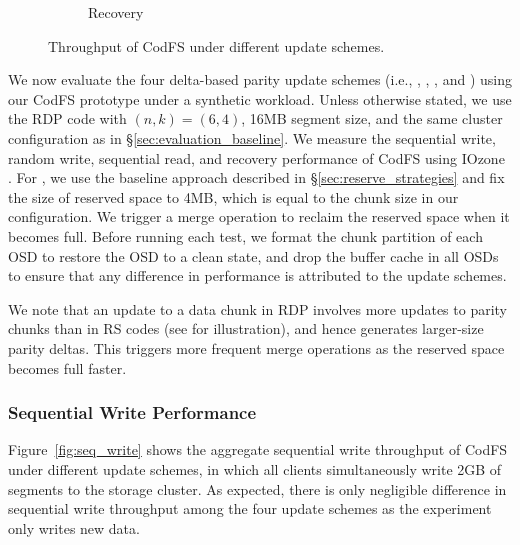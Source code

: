 \begin{figure}[t]
\begin{subfigure}[t]{0.48\linewidth}
     \caption{Recovery}
	 \label{fig:recovery}
 \end{subfigure}
 \setlength{}
 \setlength{}
 \caption{Throughput of CodFS under different update schemes.}
 \setlength\abovecaptionskip{10pt}
 \setlength\belowcaptionskip{0pt}
 \label{fig:update_schemes}
\end{figure}

We now evaluate the four delta-based parity update schemes (i.e., \FO, \FL, 
\PL, and \PLR) using our CodFS prototype under a synthetic workload.  Unless
otherwise stated, we use the RDP code \cite{corbett04} with $(n,k) = (6,4)$,
16MB segment size, and the same cluster configuration as in
\S\ref{sec:evaluation_baseline}.  We measure the sequential write, random
write, sequential read, and recovery performance of CodFS using IOzone
\cite{iozone}. For \PLR, we use the baseline approach described in
\S\ref{sec:reserve_strategies} and fix the size of reserved space to 4MB,
which is equal to the chunk size in our configuration. We trigger a merge
operation to reclaim the reserved space when it becomes full.
Before running each test, we format the chunk partition of each OSD to
restore the OSD to a clean state, and drop the buffer cache in all OSDs to
ensure that any difference in performance is attributed to the update schemes.

We note that an update to a data chunk in RDP \cite{corbett04} involves more
updates to parity chunks than in RS codes (see \cite{plank13} for illustration),
and hence generates larger-size parity deltas.  This triggers more frequent
merge operations as the reserved space becomes full faster. 

\subsubsection{Sequential Write Performance}
\label{eval:seq_write}

Figure~\ref{fig:seq_write} shows the aggregate sequential write throughput of
CodFS under different update schemes, in which all clients simultaneously
write 2GB of segments to the storage cluster.  As expected, there is only
negligible difference in sequential write throughput among the four update
schemes as the experiment only writes new data.

